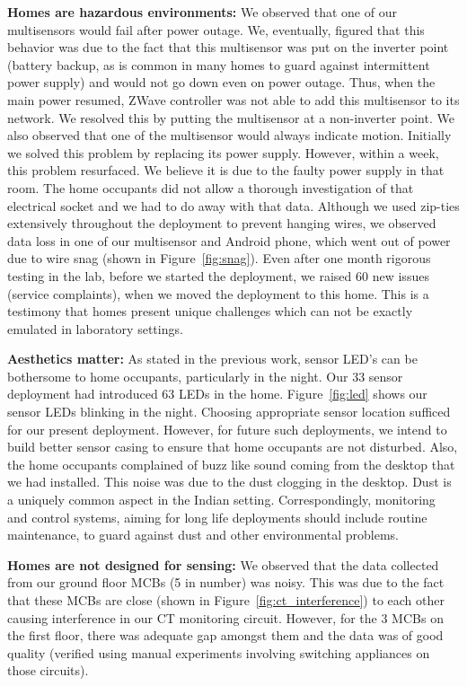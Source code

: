 \documentclass[10pt]{sensys-proc}
\newcommand{\figref}[1]{Figure~\ref{#1}}
\begin{document}
\noindent \textbf{Homes are hazardous environments:} We observed that one of our multisensors would fail after power outage. %
We, eventually, figured that this behavior was due to the fact that this multisensor was put on the inverter point (battery backup, as is common in many homes to guard against intermittent power supply) and would not go down even on power outage. Thus, when the main power resumed, ZWave controller was not able to add this multisensor to its network. We resolved this by putting the multisensor at a non-inverter point. We also observed that one of the multisensor would always indicate motion. Initially we solved this problem by replacing its power supply. However, within a week, this problem resurfaced. We believe it is due to the faulty power supply in that room. The home occupants did not allow a thorough investigation of that electrical socket and we had to do away with that data.
Although we used zip-ties extensively throughout the deployment to prevent hanging wires, we observed data loss in one of our multisensor and Android phone, which went out of power due to wire snag (shown in \figref{fig:snag}). Even after one month rigorous testing in the lab, before we started the deployment, we raised 60 new issues (service complaints), when we moved the deployment to this home. This is a testimony that homes present unique challenges which can not be exactly emulated in laboratory settings.

\noindent \textbf{Aesthetics matter:} As stated in the previous work, sensor LED's can be bothersome to home occupants, particularly in the night. Our 33 sensor deployment had introduced 63 LEDs in the home. \figref{fig:led} shows our sensor LEDs blinking in the night. Choosing appropriate sensor location sufficed for our present deployment. However, for future such deployments, we intend to build better sensor casing to ensure that home occupants are not disturbed. Also, the home occupants complained of buzz like sound coming from the desktop that we had installed. This noise was due to the dust clogging in the desktop. Dust is a uniquely common aspect in the Indian setting. Correspondingly, {monitoring and control systems, aiming for long life deployments should include routine maintenance, to guard against dust and other environmental problems.}

\noindent \textbf{Homes are not designed for sensing:} We observed that the data collected from our ground floor MCBs (5 in number) was noisy. This was due to the fact that these MCBs are close (shown in \figref{fig:ct_interference}) to each other causing interference in our CT monitoring circuit. However, for the 3 MCBs on the first floor, there was adequate gap amongst them and the data was of good quality (verified using manual experiments involving switching appliances on those circuits). %
\end{document}
